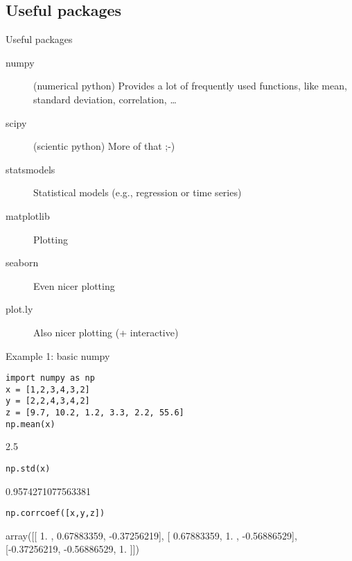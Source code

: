 \documentclass[compress]{beamer}
\begin{document}
\subsection{Useful packages}


\begin{frame}{Useful packages}
	\begin{description}
		\item[numpy] (numerical python) Provides a lot of frequently used functions, like mean, standard deviation, correlation, \ldots
		\item[scipy] (scientic python) More of that ;-)
		\item[statsmodels] Statistical models (e.g., regression or time series)
		\item[matplotlib] Plotting
		\item[seaborn] Even nicer plotting
		\item[plot.ly] Also nicer plotting (+ interactive)
	\end{description}
\end{frame}


\begin{frame}[fragile]{Example 1: basic numpy}
\begin{lstlisting}
import numpy as np
x = [1,2,3,4,3,2]
y = [2,2,4,3,4,2]
z = [9.7, 10.2, 1.2, 3.3, 2.2, 55.6]
np.mean(x)
\end{lstlisting}
\begin{lstlistingoutput}
2.5
\end{lstlistingoutput}
\begin{lstlisting}
np.std(x)
\end{lstlisting}
\begin{lstlistingoutput}
0.9574271077563381
\end{lstlistingoutput}

\begin{lstlisting}
np.corrcoef([x,y,z])
\end{lstlisting}

\begin{lstlistingoutput}
array([[ 1.        ,  0.67883359, -0.37256219],
       [ 0.67883359,  1.        , -0.56886529],
       [-0.37256219, -0.56886529,  1.        ]])
\end{lstlistingoutput}

\end{frame}
\end{document}
